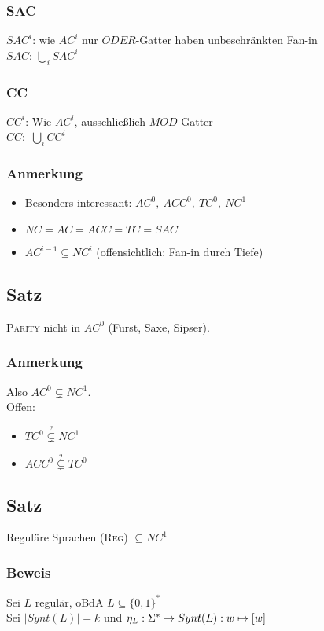         \subsubsection{SAC}
            $SAC^i$: wie $AC^i$ nur $ODER$-Gatter haben unbeschränkten Fan-in\\
            $SAC$: $\bigcup\limits_i SAC^i$
        \subsubsection{CC}
            $CC^i$: Wie $AC^i$, ausschließlich $MOD$-Gatter\\
            $CC:$ $\bigcup\limits_i CC^i$
        \subsubsection{Anmerkung}
        \begin{itemize}
            \item Besonders interessant: $AC^0,\ ACC^0,\ TC^0,\ NC^1$
            \item $NC=AC=ACC=TC=SAC$
            \item $AC^{i-1}\subseteq NC^i$ (offensichtlich: Fan-in durch Tiefe)
        \end{itemize}
    \subsection{Satz}
        \textsc{Parity} nicht in $AC^0$ (Furst, Saxe, Sipser).
        \subsubsection{Anmerkung}
            Also $AC^0\subsetneq NC^1$.\\
            Offen:
            \begin{itemize}
                \item $TC^0\overset{?}{\subsetneq} NC^1$
                \item $ACC^0\overset{?}{\subsetneq} TC^0$
            \end{itemize}
    \subsection{Satz}
        Reguläre Sprachen (\textsc{Reg}) $\subseteq NC^1$
        \subsubsection{Beweis}
            Sei $L$ regulär, oBdA $L\subseteq\{0,1\}^*$\\
            Sei $|Synt(L)|=k$ und $\eta_L:\Sigma^*\rightarrow Synt(L):w\mapsto [w]$\\

